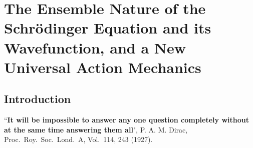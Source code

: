 \chapter[The Ensemble Nature of the Schr\"{o}dinger Equation...]{The Ensemble Nature of the Schr\"{o}dinger Equation and its Wavefunction, and a New Universal Action Mechanics}\label{chap14}



\begin{abstract}
All researchers of quantum mechanics assume that the\break Schr\"{o}dinger equation is the equation for
dynamics, akin to Newton's equation of motion or the Hamilton-Jacobi equation for the evolution
of action. The wavefunction $\psi(x)$ is assumed to be some way associated with a single particle,
or a single quantum history. Hence, Born's ad hoc interpretation is necessary to connect the psi-function to the statistical results of an ensemble of observations. Here I show that the Schr\"{o}dinger
equation is not the equation for dynamics, but it is in fact the equation for the evolution of
the ensemble probability density $\rho(x)$, written in terms of the single valued square root $\chi(x)$
of the probability density, \textit{with the constraint that $\rho(x)$ is that of a dynamical system}. It then
follows that the Born's rule is an exact relation $\chi \chi^{\ast} \equiv \rho$, by definition. This implies that a
matter-wave is absent in quantum mechanics; $\psi(x)$ is not the matter-wave. Neither is it the
representative of a single quantum history. The psi-function is an ensemble averaged quantity.
The true dynamical equation is a modified Hamilton's equation for the action-wave $\zeta(S)$. This
completes the Hamiltonian dynamics to a universal dynamics, with the encompassing uncertainty
relation $\Delta S \geq \hbar$. These findings define the kernel of quantum dynamics without any of the
foundational problems of interpretation or ontology, while retaining all the statistical results of
quantum mechanics.
\end{abstract}

\section{Introduction}\label{c14-sec1}

``\textbf{It will be impossible to answer any one question completely without at the
same time answering them all}", P. A. M. Dirac, Proc.\ Roy.\ Soc.\ Lond.\ A, Vol.\ 114,
243 (1927).

